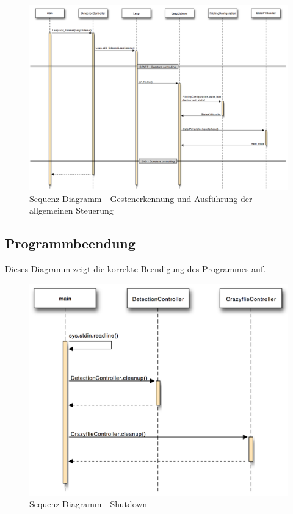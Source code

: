 \begin{figure}
	\includegraphics[width=1.0\textwidth]{figures/poc/seq_dia_detection_part2.png}
	\caption{Sequenz-Diagramm - Gestenerkennung und Ausführung der allgemeinen Steuerung}
\end{figure}


\clearpage
\subsection{Programmbeendung}
Dieses Diagramm zeigt die korrekte Beendigung des Programmes auf.

\begin{figure}[H]
	\centering
	\includegraphics[width=1.0\textwidth]{figures/poc/seq_dia_shutdown.png}
	\caption{Sequenz-Diagramm - Shutdown}
\end{figure}


